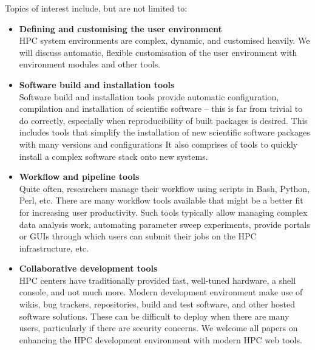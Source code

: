 \documentclass[a4paper,10pt]{article}
\begin{document}
\vspace{1em}
\noindent
Topics of interest include, but are not limited to:
\vspace{1em}
\begin{itemize}
    \item \textbf{Defining and customising the user environment}\\
    HPC system environments are complex, dynamic, and customised
    heavily.  We will discuss automatic, flexible customisation of the user
    environment with environment modules and other tools.

    \item \textbf{Software build and installation tools}\\
    Software build and installation tools provide automatic configuration, 
    compilation and installation of
    scientific software -- this is far from trivial to do correctly,
    especially when reproducibility of built packages is desired. This includes
    tools that simplify the installation of new scientific software packages
    with many versions and configurations
    It also comprises of tools to quickly install a complex software stack onto new systems.


    \item \textbf{Workflow and pipeline tools }\\
    Quite often, researchers manage their workflow using scripts in
    Bash, Python, Perl, etc. There are many workflow tools available that might
    be a better fit for increasing user productivity. Such tools typically allow managing
    complex data analysis work, automating parameter sweep experiments, provide portals
    or GUIs through which users can submit their jobs on the HPC infrastructure, etc.

	\item \textbf{Collaborative development tools}\\
	HPC centers have traditionally provided fast, well-tuned hardware, a shell
	console, and not much more.  Modern development environment make use of wikis, 
	bug trackers, repositories, build and test software, and other hosted software
	solutions.  These can be difficult to deploy when there are many users,
	particularly if there are security concerns.  We welcome all papers on enhancing
	the HPC development environment with modern HPC web tools.
	

\end{itemize}
\end{document}
